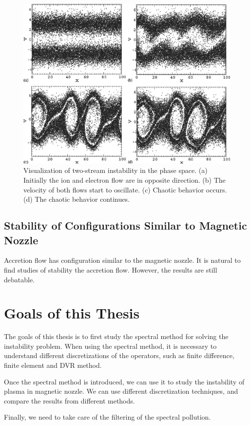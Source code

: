 \begin{figure}[H]
	\centering
	\includegraphics[width=0.7\linewidth]{img/introduction/two_stream_instability}
	\caption{Visualization of two-stream instability in the phase space. (a) Initially the ion and electron flow are in opposite direction. (b) The velocity of both flows start to oscillate. (c) Chaotic behavior occurs. (d) The chaotic behavior continues. \cite{ha_nonlinear_2011}}
	\label{fig:two_stream_instability}
\end{figure}

\subsection{Stability of Configurations Similar to Magnetic Nozzle}
Accretion flow has configuration similar to the magnetic nozzle. It is natural to find studies of stability the accretion flow. However, the results are still debatable. \cite{keto_stability_2020,aikawa_stability_1979,stellingwerf_stability_1978}


\section{Goals of this Thesis}
The goals of this thesis is to first study the spectral method for solving the instability problem. When using the spectral method, it is necessary to understand different discretizations of the operators, such as finite difference, finite element and DVR method.

Once the spectral method is introduced, we can use it to study the instability of plasma in magnetic nozzle. We can use different discretization techniques, and compare the results from different methods.

Finally, we need to take care of the filtering of the spectral pollution.



